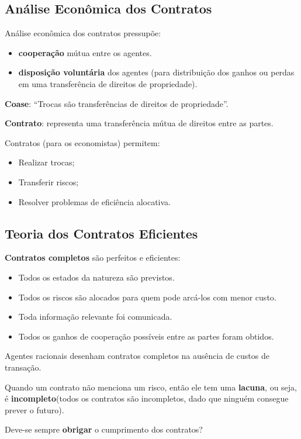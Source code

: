\documentclass[a4paper,12pt]{article}[abntex2]
\begin{document}
\subsection{\textbf{Análise Econômica dos Contratos}}
Análise econômica dos contratos pressupõe:\begin{itemize}
    \item \textbf{cooperação} mútua entre os agentes.
    \item \textbf{disposição voluntária} dos agentes (para distribuição dos ganhos ou perdas em uma transferência de direitos de propriedade).
\end{itemize}

\textbf{Coase}: “Trocas são transferências de direitos de propriedade”. 

\textbf{Contrato}: representa uma transferência mútua de direitos entre as partes.

Contratos (para os economistas) permitem:\begin{itemize}
    \item Realizar trocas;
    \item Transferir riscos;
    \item Resolver problemas de eficiência alocativa.
\end{itemize}

\subsection{\textbf{Teoria dos Contratos Eficientes}}

\textbf{Contratos completos} são perfeitos e eficientes:\begin{itemize}
    \item Todos os estados da natureza são previstos.
    \item Todos os riscos são alocados para quem pode arcá-los com menor custo.
    \item Toda informação relevante foi comunicada.
    \item Todos os ganhos de cooperação possíveis entre as partes foram obtidos.
\end{itemize}


Agentes racionais desenham contratos completos na ausência de custos de transação.

Quando um contrato não menciona um risco, então ele tem uma \textbf{lacuna}, ou seja, é \textbf{incompleto}(todos os contratos são incompletos, dado que ninguém consegue prever o futuro).

Deve-se sempre \textbf{obrigar} o cumprimento dos contratos? 
\end{document}
